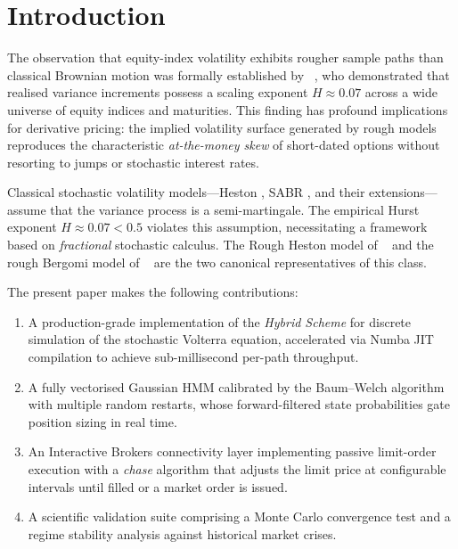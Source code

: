 \documentclass[conference]{IEEEtran}
\begin{document}
\section{Introduction}\label{sec:intro}

The observation that equity-index volatility exhibits rougher sample
paths than classical Brownian motion was formally established by
\citeauthor{gatheral2018volatility}~\cite{gatheral2018volatility},
who demonstrated that realised variance increments possess a scaling
exponent $H \approx 0.07$ across a wide universe of equity indices
and maturities.  This finding has profound implications for derivative
pricing: the implied volatility surface generated by rough models
reproduces the characteristic \emph{at-the-money skew} of short-dated
options without resorting to jumps or stochastic interest rates.

Classical stochastic volatility models—Heston \cite{heston1993closed},
SABR \cite{hagan2002managing}, and their extensions—assume that the
variance process is a semi-martingale.  The empirical Hurst exponent
$H \approx 0.07 < 0.5$ violates this assumption, necessitating a
framework based on \emph{fractional} stochastic calculus.  The Rough
Heston model of \citeauthor{el2019roughening}~\cite{el2019roughening}
and the rough Bergomi model of
\citeauthor{bayer2016pricing}~\cite{bayer2016pricing} are the two
canonical representatives of this class.

The present paper makes the following contributions:

\begin{enumerate}[leftmargin=*, label=\textbf{C\arabic*.}]
  \item A production-grade implementation of the \emph{Hybrid Scheme}
        \cite{bennedsen2017hybrid} for discrete simulation of the
        stochastic Volterra equation, accelerated via Numba JIT
        compilation to achieve sub-millisecond per-path throughput.

  \item A fully vectorised Gaussian HMM calibrated by the
        Baum--Welch algorithm with multiple random restarts, whose
        forward-filtered state probabilities gate position sizing in
        real time.

  \item An Interactive Brokers connectivity layer implementing
        passive limit-order execution with a \emph{chase} algorithm
        that adjusts the limit price at configurable intervals until
        filled or a market order is issued.

  \item A scientific validation suite comprising a Monte Carlo
        convergence test and a regime stability analysis against
        historical market crises.
\end{enumerate}
\end{document}
